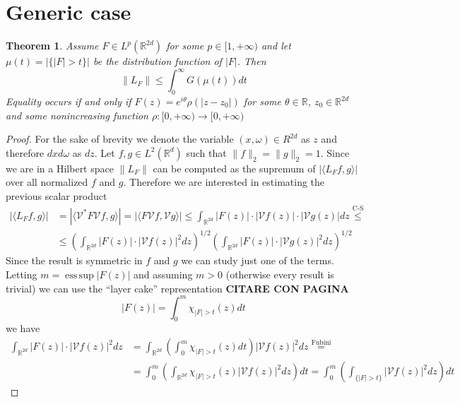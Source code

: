 \documentclass[corpo=11pt, stile=classica, tipotesi=custom,
greek, evenboxes, english]{toptesi}
\numberwithin{equation}{chapter}
\newtheorem{teo}{Theorem}[chapter] %
\newcommand{\R}{\mathbb{R}} %
\newcommand{\V}{\mathcal{V}} %
\DeclareMathOperator*{\esssup}{ess\,sup}
\begin{document}
\section{Generic case}
\begin{teo}\label{norm limitation}
	Assume $F \in L^p(\R^{2d})$ for some $p \in [1,+\infty)$ and let $\mu(t) = |\{|F|>t\}|$ be the distribution function of $|F|$. Then
	\begin{equation}\label{norm limitation formula}
		\| L_F \| \leq \int_0^{\infty} G(\mu(t))dt
	\end{equation}
	Equality occurs if and only if $F(z)=e^{i\theta}\rho(|z-z_0|)$ for some $\theta \in \R$, $z_0 \in \R^{2d}$ and some nonincreasing function $\rho : [0,+\infty) \rightarrow [0,+\infty)$
\end{teo}
\begin{proof}
	For the sake of brevity we denote the variable $(x,\omega) \in R^{2d}$ as $z$ and therefore $dxd\omega$ as $dz$. Let $f,g \in L^2(\R^d)$ such that $\| f \|_2 = \| g \|_2 = 1$.
	Since we are in a Hilbert space $\| L_F \|$ can be computed as the supremum of $|\langle L_F f,g \rangle|$ over all normalized $f$ and $g$. Therefore we are interested in estimating the previous scalar product
	\begin{equation}\label{first inequality}
	\begin{aligned}
		| \langle L_F f, g \rangle |  &= | \langle \V^* F \V f, g \rangle | = | \langle F \V f, \V g \rangle | \leq \int_{\R^{2d}} |F(z)| \cdot |\V f(z)| \cdot | \V g(z) | dz \overset{\text{C-S}}{\leq} \\
									  &\leq \left( \int_{\R^{2d}} |F(z)| \cdot |\V f(z)|^2 dz \right)^{1/2} \left( \int_{\R^{2d}} |F(z)| \cdot |\V g(z)|^2 dz \right)^{1/2} 
	\end{aligned}
	\end{equation}
	Since the result is symmetric in $f$ and $g$ we can study just one of the terms. Letting $m = \esssup |F(z)|$ and assuming $m>0$ (otherwise every result is trivial) we can use the ``layer cake'' representation \textbf{CITARE CON PAGINA}
	\begin{equation*}
		|F(z)| = \int_0^m \chi_{|F|>t}(z)dt 
	\end{equation*}
	we have
	\begin{align*}
		\int_{\R^{2d}} |F(z)| \cdot |\V f(z)|^2 dz &= \int_{\R^{2d}} \left( \int_0^m \chi_{|F|>t}(z)dt \right) |\V f(z)|^2 dz \overset{\text{Fubini}}{=}\\
											 &= \int_0^m \left( \int_{\R^{2d}} \chi_{|F|>t}(z) |\V f(z)|^2 dz \right)dt = \int_0^m \left( \int_{\{|F|>t\}} |\V f(z)|^2 dz \right)dt

\end{align*}
\end{proof}
\end{document}
